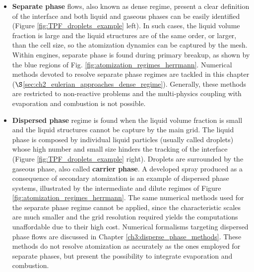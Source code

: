 
\begin{itemize}

\item \textbf{Separate phase} flows, also known as dense regime, present a clear definition of the interface and both liquid and gaseous phases can be easily identified (Figure \ref{fig:TPF_droplets_example} left). In such cases, the liquid volume fraction is large and the liquid structures are of the same order, or larger, than the cell size, so the atomization dynamics can be captured by the mesh. Within engines, separate phase is found during primary breakup, as shown by the blue regions of Fig. \ref{fig:atomization_regimes_herrmann}. Numerical methods devoted to resolve separate phase regimes are tackled in this chapter ($\S$\ref{sec:ch2_eulerian_approaches_dense_regime}). Generally, these methods are restricted to non-reactive problems and the multi-physics coupling with evaporation and combustion is not possible.

\item \textbf{Dispersed phase} regime is found when the liquid volume fraction is small and the liquid structures cannot be capture by the main grid. The liquid phase is composed by individual liquid particles (usually called droplets) whose high number and small size hinders the tracking of the interface (Figure \ref{fig:TPF_droplets_example} right). Droplets are surrounded by the gaseous phase, also called \textbf{carrier phase}. A developed spray produced as a consequence of secondary atomization is an example of dispersed phase systems, illustrated by the intermediate and dilute regimes of Figure \ref{fig:atomization_regimes_herrmann}. The same numerical methods used for the separate phase regime cannot be applied, since the characteristic scales are much smaller and the grid resolution required yields the computations unaffordable due to their high cost. Numerical formalisms targeting dispersed phase flows are discussed in Chapter \ref{ch3:disperse_phase_methods}. These methods do not resolve atomization as accurately as the ones employed for separate phases, but present the possibility to integrate evaporation and combustion.

\end{itemize}


